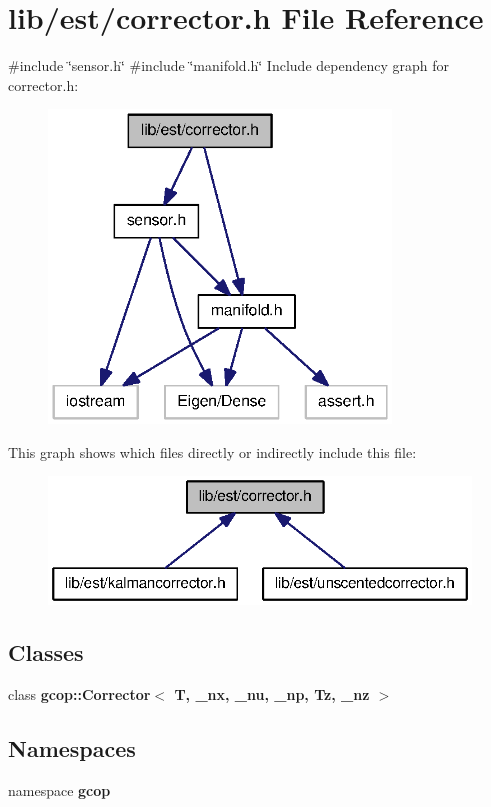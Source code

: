\section{lib/est/corrector.h \-File \-Reference}
\label{corrector_8h}
{\ttfamily \#include \char`\"{}sensor.\-h\char`\"{}}\*
{\ttfamily \#include \char`\"{}manifold.\-h\char`\"{}}\*
\-Include dependency graph for corrector.\-h\-:\nopagebreak
\begin{figure}[H]
\begin{center}
\leavevmode
\includegraphics[width=258pt]{corrector_8h__incl}
\end{center}
\end{figure}
\-This graph shows which files directly or indirectly include this file\-:\nopagebreak
\begin{figure}[H]
\begin{center}
\leavevmode
\includegraphics[width=322pt]{corrector_8h__dep__incl}
\end{center}
\end{figure}
\subsection*{\-Classes}
\begin{DoxyCompactItemize}
\item 
class {\bf gcop\-::\-Corrector$<$ T, \-\_\-nx, \-\_\-nu, \-\_\-np, Tz, \-\_\-nz $>$}
\end{DoxyCompactItemize}
\subsection*{\-Namespaces}
\begin{DoxyCompactItemize}
\item 
namespace {\bf gcop}
\end{DoxyCompactItemize}
